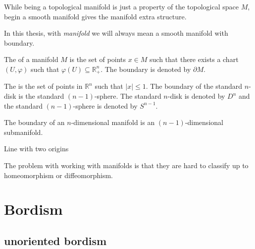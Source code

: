 \documentclass[a4paper,11pt]{article}
\begin{document}
\begin{remark}
    While being a topological manifold is just a property of the topological space \(M\), begin a smooth manifold gives the manifold extra structure.
\end{remark}

\begin{remark}
    In this thesis, with \emph{manifold} we will always mean a smooth manifold with boundary.
\end{remark}

\begin{definition}[Boundary]
    The  of a manifold \(M\) is the set of points \(x\in M\) such that there exists a chart \((U,\varphi)\) such that \(\varphi(U)\subseteq\mathbb{R}^n_+\). 
    The boundary is denoted by \(\partial M\).
\end{definition}

\begin{example}
    The  is the set of points in \(\mathbb{R}^n\) such that \(|{x}|\leq1\). 
    The boundary of the standard \(n\)-disk is the standard \((n-1)\)-sphere.
    The standard \(n\)-disk is denoted by \(D^n\) and the standard \((n-1)\)-sphere is denoted by \(S^{n-1}\).
\end{example}

\begin{remark}
    The boundary of an \(n\)-dimensional manifold is an \((n-1)\)-dimensional submanifold.
\end{remark}

\begin{nonex}
    Line with two origins
\end{nonex}

The problem with working with manifolds is that they are hard to classify up to homeomorphism or diffeomorphism.

\section{Bordism}

\subsection{unoriented bordism}

\begin{definition}
\end{definition}

\begin{definition}[nullbordant]
\end{definition}
\end{document}
